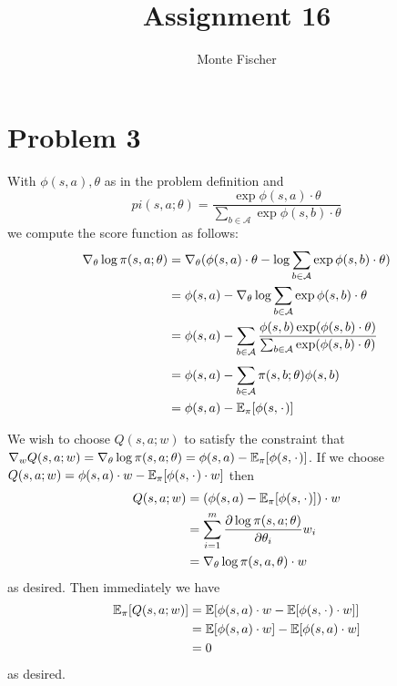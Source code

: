 \documentclass{article}
\title{Assignment 16}
\author{Monte Fischer}
\newcommand*{\Z}{\makebox[1ex]{\textbf{$\cdot$}}}
\begin{document}
\maketitle

\section*{Problem 3}

With $\phi(s,a), \theta$ as in the problem definition and 
$$pi(s, a; \theta) = \frac{\exp{\phi(s,a)\cdot\theta}}{\sum_{b\in\mathcal{A}} \exp{\phi(s,b)\cdot\theta}} $$
we compute the score function as follows:
\begin{align*}
    \nabla_\theta \log \pi(s, a;\theta) &= \nabla_\theta(\phi(s,a)\cdot\theta - \log\sum_{b\in\mathcal{A}} \exp{\phi(s,b)\cdot\theta})\\
    &= \phi(s,a) - \nabla_\theta\log\sum_{b\in\mathcal{A}} \exp{\phi(s,b)\cdot\theta}\\
    &= \phi(s,a) - \sum_{b\in\mathcal{A}}^{} \frac{\phi(s,b) \exp(\phi(s,b)\cdot\theta)}{\sum_{b\in\mathcal{A}}^{} \exp(\phi(s,b)\cdot\theta)}\\
    &= \phi(s,a) - \sum_{b\in\mathcal{A}}^{} \pi(s, b; \theta) \phi(s,b)\\
    &= \phi(s,a) - \mathbb{E}_\pi [\phi(s,\Z)]
\end{align*}

We wish to choose $Q(s,a;w)$ to satisfy the constraint that $\nabla_w Q(s,a;w) = \nabla_\theta \log\pi(s, a; \theta) = \phi(s, a) - \mathbb{E}_\pi[\phi(s,\Z)]$. If we choose $Q(s,a;w) = \phi(s,a)\cdot w - \mathbb{E}_\pi [\phi(s,\Z)\cdot w]$ then
\begin{align*}
    Q(s,a;w) &= (\phi(s,a) - \mathbb{E}_\pi[\phi(s, \Z)])\cdot w\\
    &= \sum_{i=1}^{m} \frac{\partial \log \pi(s,a;\theta)}{\partial \theta_i} w_i \\
    &= \nabla_\theta \log\pi(s,a,\theta) \cdot w
\end{align*}
as desired. Then immediately we have
\begin{align*}
    \mathbb{E}_\pi[Q(s,a;w)] &= \mathbb{E}[\phi(s,a)\cdot w - \mathbb{E}[\phi(s, \Z)\cdot w]]\\
    &= \mathbb{E}[\phi(s,a)\cdot w] -\mathbb{E}[\phi(s,a)\cdot w]\\
    &= 0
\end{align*}
as desired.
\end{document}
